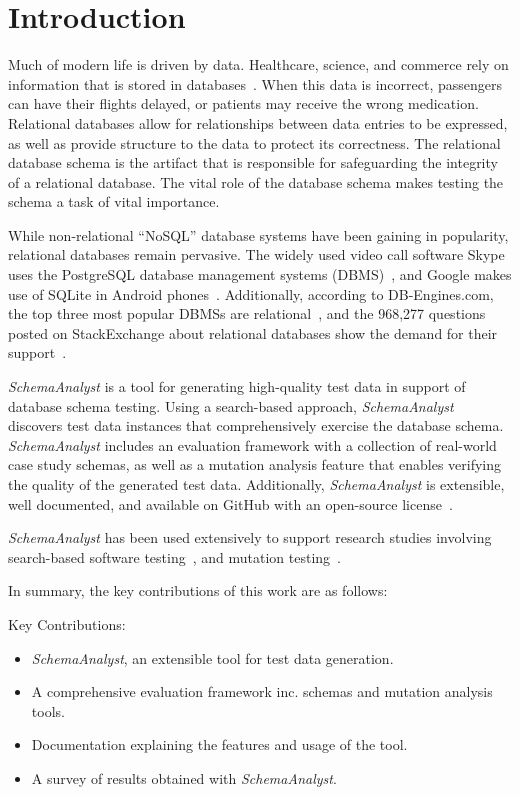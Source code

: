 \section{Introduction}

Much of modern life is driven by data.  Healthcare, science, and commerce rely on information that is
stored in databases~\cite{kapfhammer2007comprehensive}.  When this data is incorrect, passengers can have
their flights delayed, or patients may receive the wrong medication. 
Relational databases allow for relationships between data entries to be expressed, as well as provide structure to 
the data to protect its correctness. The relational database schema is the artifact
that is responsible for safeguarding the integrity of a relational database. The vital role of the database
schema makes testing the schema a task of vital importance.

While non-relational ``NoSQL'' database systems have been gaining in popularity, relational databases remain
pervasive. The widely used video call software Skype uses the PostgreSQL database management systems
(DBMS)~\cite{https://www.postgresql.org/about/users/},
and Google makes use of SQLite in Android phones~\cite{}.
Additionally, according to DB-Engines.com, the top three most popular DBMSs are 
relational~\cite{https://www.sqlite.org/famous.html}, and the 968,277 questions posted on StackExchange 
about relational databases show the demand for their support~\cite{http://goo.gl/F3Tiax}.

\textit{SchemaAnalyst} is a tool for generating high-quality test data in support of database schema
testing. Using a search-based approach, \textit{SchemaAnalyst} discovers test data instances that
comprehensively exercise the database schema. \textit{SchemaAnalyst} includes an evaluation framework
with a collection of real-world case study schemas, as well as a mutation analysis feature
that enables verifying the quality of the generated test data. Additionally, \textit{SchemaAnalyst}
is extensible, well documented, and available on GitHub with an open-source license~\cite{tool}.

\textit{SchemaAnalyst} has been used extensively to support research studies involving search-based
software testing~\cite{kapfhammer2013search,mcminn2015effectiveness,kinneer2015automatically}, and
mutation testing~\cite{wright2013efficient,wright2014impact,wright2015mutation}.

In summary, the key contributions of this work are as follows:

Key Contributions:
\begin{itemize}
\item \textit{SchemaAnalyst}, an extensible tool for test data generation.
\item A comprehensive evaluation framework inc. schemas and mutation analysis tools.
\item Documentation explaining the features and usage of the tool.
\item A survey of results obtained with \textit{SchemaAnalyst}.
\end{itemize}
